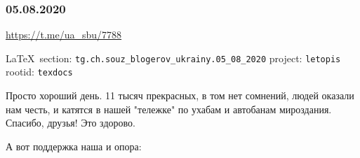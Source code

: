  
 
\subsubsection{05.08.2020}
\label{sec:tg.ch.souz_blogerov_ukrainy.05_08_2020}
\url{https://t.me/ua_sbu/7788}
  
\vspace{0.5cm}
 {\ifDEBUG\small\LaTeX~section: \verb|tg.ch.souz_blogerov_ukrainy.05_08_2020| project: \verb|letopis| rootid: \verb|texdocs|	\fi}
\vspace{0.5cm}
  
Просто хороший день. 11 тысяч прекрасных, в том нет сомнений, людей оказали нам
честь, и катятся в нашей "тележке" по ухабам и автобанам мироздания. Спасибо,
друзья! Это здорово. 

А вот поддержка наша и опора: 

